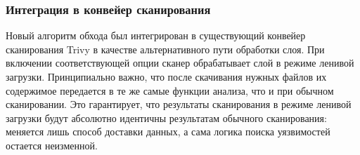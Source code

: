 \subsubsection{Интеграция в конвейер сканирования}

Новый алгоритм обхода был интегрирован в существующий конвейер сканирования Trivy в качестве альтернативного пути обработки слоя. При включении соответствующей опции сканер обрабатывает слой в режиме ленивой загрузки. Принципиально важно, что после скачивания нужных файлов их содержимое передается в те же самые функции анализа, что и при обычном сканировании. Это гарантирует, что результаты сканирования в режиме ленивой загрузки будут абсолютно идентичны результатам обычного сканирования: меняется лишь способ доставки данных, а сама логика поиска уязвимостей остается неизменной.

\newpage
